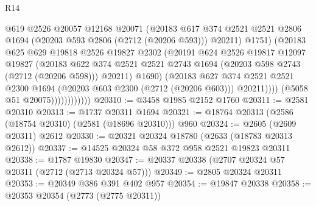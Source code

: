 \begin{lexlean}{R14}
\begin{coremodule}
                                @619
                                @2526
                                @20057
                                @12168
                                @20071
                                (@20183
                                  @617
                                  @374
                                  @2521
                                  @2521
                                  @2806
                                  @1694
                                  (@20203 @593 @2806 (@2712 (@20206 @593)))
                                  @20211)
                                @1751)
                              (@20183
                                @625
                                @629
                                @19818
                                @2526
                                @19827
                                @2302
                                (@20191
                                  @624
                                  @2526
                                  @19817
                                  @12097
                                  @19827
                                  (@20183
                                    @622
                                    @374
                                    @2521
                                    @2521
                                    @2743
                                    @1694
                                    (@20203 @598 @2743 (@2712 (@20206 @598)))
                                    @20211)
                                  @1690)
                                (@20183
                                  @627
                                  @374
                                  @2521
                                  @2521
                                  @2300
                                  @1694
                                  (@20203 @603 @2300 (@2712 (@20206 @603)))
                                  @20211))))
                          (@5058 @51 @20075))))))))))))
@20310 := @3458 @1985 @2152 @1760
@20311 := @2581 @20310
@20313 := @1737 @20311 @1694
@20321 := @18764 @20313 (@2586 (@18754 @20310) (@2581 (@18696 @20310))) @960
@20324 := @2605 (@2609 @20311) @2612
@20330 := @20321 @20324 @18780 (@2633 (@18783 @20313 @2612))
@20337 := @14525 @20324 @58 @372 @958 @2521 @19823 @20311
@20338 := @1787 @19830
@20347 := @20337 @20338 (@2707 @20324 @57 @20311 (@2712 (@2713 @20324 @57)))
@20349 := @2805 @20324 @20311
@20353 := @20349 @386 @391 @402 @957
@20354 := @19847 @20338
@20358 := @20353 @20354 (@2773 (@2775 @20311))

\end{coremodule}
\end{lexlean}
